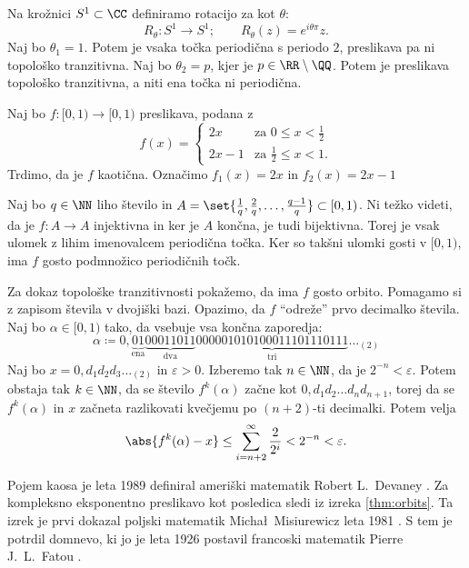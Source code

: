\begin{zgled}
    Na krožnici \(S^1 \subset \CC\) definiramo rotacijo za kot \(\theta\):
    \[R_\theta \colon S^1 \to S^1; \qquad R_\theta (z) = e^{i \theta \pi} z.\]
    Naj bo \(\theta_1 = 1\). Potem je vsaka točka periodična s periodo \(\num{2}\), preslikava pa ni topološko  tranzitivna. Naj bo \(\theta_2 = p\), kjer je \(p \in \RR \setminus \QQ\). Potem je preslikava topološko tranzitivna, a niti ena točka ni periodična.
\end{zgled}

\begin{zgled} \label{ex:double}
    Naj bo \(f \colon [0, 1) \to [0, 1)\) preslikava, podana z
    \[
        f (x) =
        \begin{cases}
            2x & \text{za } 0 \leq x < \frac{1}{2}\\
            2x - 1 & \text{za } \frac{1}{2} \leq x < 1.
        \end{cases}
    \]
    Trdimo, da je \(f\) kaotična. Označimo \(f_1 (x) = 2 x\) in \(f_2 (x) = 2x - 1\)

    Naj bo \(q \in \NN\) liho število in \(A = \set{\frac{1}{q}, \frac{2}{q}, \dots, \frac{q - 1}{q}} \subset [0, 1)\). Ni težko videti, da je \(f \colon A \to A\) injektivna in ker je \(A\) končna, je tudi bijektivna. Torej je vsak ulomek z lihim imenovalcem periodična točka. Ker so takšni ulomki gosti v \([0, 1)\), ima \(f\) gosto podmnožico periodičnih točk.

    Za dokaz topološke tranzitivnosti pokažemo, da ima \(f\) gosto orbito. Pomagamo si z zapisom števila v dvojiški bazi. Opazimo, da \(f\) ``odreže'' prvo decimalko števila. Naj bo \(\alpha \in [0, 1)\) tako, da vsebuje vsa končna zaporedja:
    \[\alpha \coloneq 0, \underbrace{0 1}_{\text{ena}} \underbrace{00011011}_{\text{dva}} \underbrace{000 001 010 100 011 101 110 111}_{\text{tri}} \dots_{(2)}\]
    Naj bo \(x = 0, d_1 d_2 d_3 \dots_{(2)}\) in \(\varepsilon > 0\). Izberemo tak \(n \in \NN\), da je \(2^{- n} < \varepsilon\). Potem obstaja tak \(k \in \NN\), da se število \(f^k (\alpha)\) začne kot \(0, d_1 d_2 \dots d_n d_{n + 1}\), torej da se \(f^k (\alpha)\) in \(x\) začneta razlikovati kvečjemu po \((n + 2)\)-ti decimalki. Potem velja
    \[\abs{f^k (\alpha) - x} \leq \sum_{i = n + 2}^{\infty} \frac{2}{2^{i}} < 2^{- n} < \varepsilon.\]
\end{zgled}

\noindent Pojem kaosa je leta \num{1989} definiral ameriški matematik Robert L.~Devaney \cite{Devaney_1986}. Za kompleksno eksponentno preslikavo kot posledica sledi iz izreka  \ref{thm:orbits}. Ta izrek je prvi dokazal poljski matematik Micha\l\ Misiurewicz leta \num{1981} \cite{Misiurewicz_1981}. S tem je potrdil domnevo, ki jo je leta \num{1926} postavil francoski matematik Pierre J.~L.~Fatou \cite{Fatou_1926}.

